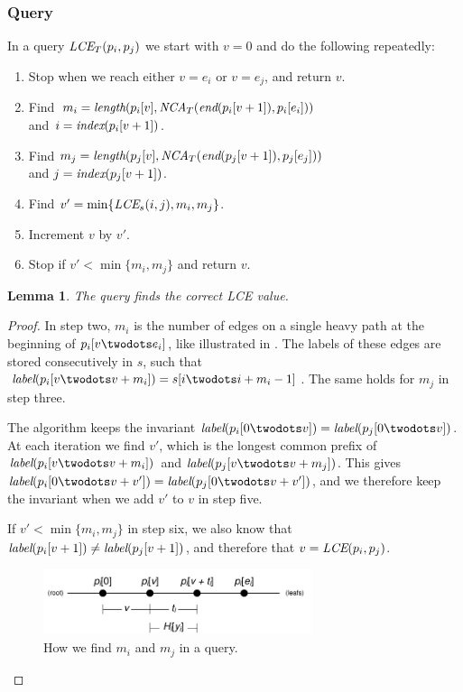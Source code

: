 \documentclass[a4]{article}
\newcommand*{\pref}{\prettyref}
\newtheorem{lemma}{Lemma}
\begin{document}
\subsubsection{Query}

In a  query $\textit{LCE}_T(p_i,p_j)$ we start with $v=0$ and do the following repeatedly:
\begin{enumerate}
\item Stop when we reach either $v=e_i$ or $v=e_j$, and return $v$.
\item Find $m_i = \textit{length}(p_i[v], \textit{NCA}_T(\textit{end}(p_i[v+1]), p_i[e_i]))$ \\ and $i=\textit{index}(p_i[v+1])$.
\item Find $m_j = \textit{length}(p_j[v], \textit{NCA}_T(\textit{end}(p_j[v+1]), p_j[e_j]))$ \\ and $j=\textit{index}(p_j[v+1])$.
\item Find $v'=\min\{\textit{LCE}_s(i,j),m_i,m_j\}$.
\item Increment $v$ by $v'$.
\item Stop if $v'<\min\{m_i,m_j\}$ and return $v$.
\end{enumerate}

\begin{lemma}
The  query finds the correct LCE value.
\end{lemma}
\begin{proof}
In step two, $m_i$ is the number of edges on a single heavy path at the beginning of $p_i[v\twodots e_i]$, like illustrated in \pref{fig:tree-heavy-query}. The labels of these edges are stored consecutively in $s$, such that $\zlabel(p_i[v\twodots v+m_i])=s[i\twodots i + m_i-1]$. The same holds for $m_j$ in step three.

The algorithm keeps the invariant $\zlabel(p_i[0\twodots v]) = \zlabel(p_j[0\twodots v])$. At each iteration we find $v'$, which is the longest common prefix of $\zlabel(p_i[v\twodots v+m_i])$ and $\zlabel(p_j[v\twodots v+m_j])$. This gives $\zlabel(p_i[0\twodots v+v']) = \zlabel(p_j[0\twodots v+v'])$, and we therefore keep the invariant when we add $v'$ to $v$ in step five.

If $v'<\min\{m_i,m_j\}$ in step six, we also know that $\textit{label}(p_i[v+1]) \neq \textit{label}(p_j[v+1])$, and therefore that $v=\textit{LCE}(p_i,p_j)$.

\begin{figure}[tp]
    \begin{center}
        \includegraphics[width=0.7\textwidth,page=2]{tree-fingerprint.pdf}
    \end{center}
    \caption{\label{fig:tree-heavy-query}How we find $m_i$ and $m_j$ in a  query.}
\end{figure}
\end{proof}
\end{document}
